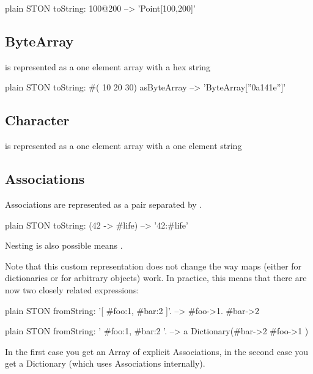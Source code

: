 \documentclass[10pt,twoside,english]{_support/latex/sbabook/sbabook}
\begin{document}
\begin{displaycode}{plain}
STON toString: 100@200
   --> 'Point[100,200]'
\end{displaycode}
\subsection{ByteArray}
  is represented as a one element array with a hex string

\begin{displaycode}{plain}
STON toString: #( 10 20 30) asByteArray
   --> 'ByteArray[''0a141e'']'
\end{displaycode}
\subsection{Character}
  is represented as a one element array with a one element string

\subsection{Associations}
Associations are represented as a pair separated by \textcode{:}.

\begin{displaycode}{plain}
STON toString: (42 -> #life)
   --> '42:#life'
\end{displaycode}

Nesting is also possible  means .

Note that this custom representation does not change the way maps (either for dictionaries or for arbitrary objects) work. In practice, this means that there
are now two closely related expressions:

\begin{displaycode}{plain}
STON fromString: '[ #foo:1, #bar:2 ]'.
   --> { #foo->1. #bar->2 }
\end{displaycode}

\begin{displaycode}{plain}
STON fromString: '{ #foo:1, #bar:2 }'.
   --> a Dictionary(#bar->2 #foo->1 )
\end{displaycode}

In the first case you get an Array of explicit Associations, in the second case you get a Dictionary (which uses Associations internally).
\end{document}
